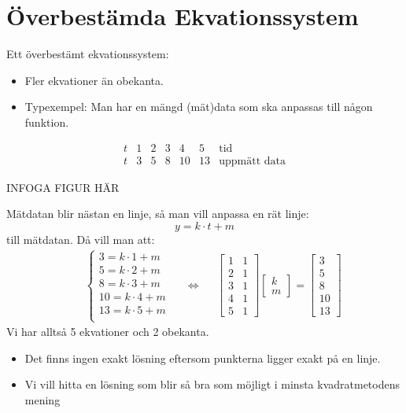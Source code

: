 \section{Överbestämda Ekvationssystem} %
\label{sec:_verbest_mda_ekvationssystem}
\begin{Def}
    Ett överbestämt ekvationssystem:
    \begin{itemize}
    	\item Fler ekvationer än obekanta.
    	\item Typexempel: Man har en mängd (mät)data som ska anpassas till någon funktion.
    \end{itemize}
\end{Def}
\begin{Ex}
\[
    \begin{array}{c|c|c|c|c|c|l}
    	t & 1 & 2 & 3 & 4 & 5 & \mbox{tid}\\
    	\hline
    	t & 3 & 5 & 8 & 10 & 13 & \mbox{uppmätt data}
    \end{array}
\]
\begin{center}
	INFOGA FIGUR HÄR	
\end{center}
Mätdatan blir nästan en linje, så man vill anpassa en rät linje:
\[
    y = k \cdot t + m
\]
till mätdatan. Då vill man att:
\begin{align*}
&&\begin{cases}
	3 = k \cdot 1 + m\\
	5 = k \cdot 2 + m\\
	8 = k \cdot 3 + m\\
	10 = k \cdot 4 + m\\
	13 = k \cdot 5 + m\\
\end{cases}
&&\Leftrightarrow
&&\begin{bmatrix} 1 & 1\\2 & 1\\3&1\\4&1\\5&1 \end{bmatrix}
\begin{bmatrix} k\\m \end{bmatrix} = 
\begin{bmatrix} 3\\5\\8\\10\\13 \end{bmatrix}
\end{align*}
Vi har alltså 5 ekvationer och 2 obekanta.
\begin{itemize}
	\item Det finns ingen exakt lösning eftersom punkterna ligger exakt på en linje.
	\item Vi vill hitta en lösning som blir så bra som möjligt i minsta kvadratmetodens mening
\end{itemize}
\end{Ex}
